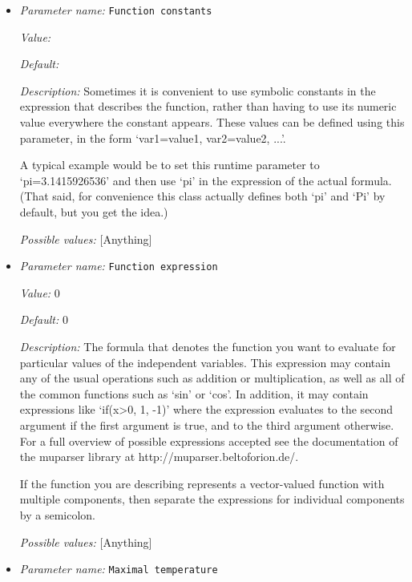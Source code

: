 \begin{itemize}
\item {\it Parameter name:} {\tt Function constants}
\label{parameters:Boundary temperature model/Function/Function constants}


{\it Value:} 


{\it Default:} 


{\it Description:} Sometimes it is convenient to use symbolic constants in the expression that describes the function, rather than having to use its numeric value everywhere the constant appears. These values can be defined using this parameter, in the form `var1=value1, var2=value2, ...'.

A typical example would be to set this runtime parameter to `pi=3.1415926536' and then use `pi' in the expression of the actual formula. (That said, for convenience this class actually defines both `pi' and `Pi' by default, but you get the idea.)


{\it Possible values:} [Anything]
\item {\it Parameter name:} {\tt Function expression}
\label{parameters:Boundary temperature model/Function/Function expression}


{\it Value:} 0


{\it Default:} 0


{\it Description:} The formula that denotes the function you want to evaluate for particular values of the independent variables. This expression may contain any of the usual operations such as addition or multiplication, as well as all of the common functions such as `sin' or `cos'. In addition, it may contain expressions like `if(x>0, 1, -1)' where the expression evaluates to the second argument if the first argument is true, and to the third argument otherwise. For a full overview of possible expressions accepted see the documentation of the muparser library at http://muparser.beltoforion.de/.

If the function you are describing represents a vector-valued function with multiple components, then separate the expressions for individual components by a semicolon.


{\it Possible values:} [Anything]
\item {\it Parameter name:} {\tt Maximal temperature}
\label{parameters:Boundary temperature model/Function/Maximal temperature}



\end{itemize}
